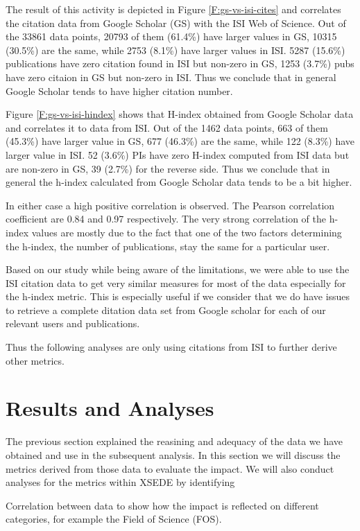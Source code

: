 \documentclass{sig-alternate}
\begin{document}
The result of this activity is depicted in Figure \ref{F:gs-vs-isi-cites} and correlates the citation data from Google Scholar (GS) with the ISI Web of Science. Out of the 33861 data points, 20793 of them (61.4\%) have larger values in GS, 10315 (30.5\%) are the same, while 2753 (8.1\%) have larger values in ISI. 5287 (15.6\%) publications have zero citation found in ISI but non-zero in GS, 1253 (3.7\%) pubs have zero citaion in GS but non-zero in ISI. Thus we conclude that in general Google Scholar tends to have higher citation number. 
 
Figure \ref{F:gs-vs-isi-hindex} shows that H-index obtained from Google Scholar data and correlates it to data from ISI. Out of the 1462 data points, 663 of them (45.3\%) have larger value in GS, 677 (46.3\%) are the same, while 122 (8.3\%) have larger value in ISI. 52 (3.6\%) PIs have zero H-index computed from ISI data but are non-zero in GS, 39 (2.7\%) for the reverse side. Thus we conclude that in general the h-index calculated from Google Scholar data tends to be a bit higher. 
 
In either case a high positive correlation is observed. The Pearson correlation coefficient are 0.84 and 0.97 respectively. The very strong correlation of the h-index values are mostly due to the fact that one of the two factors determining the h-index, the number of publications, stay the same for a particular user. 
 
Based on our study while being aware of the limitations, we were able to use the ISI citation data to get very similar measures for most of the data especially for the h-index metric. This is especially useful if we consider that we do have issues to retrieve a complete ditation data set from Google scholar for each of our relevant users and publications.

Thus the following analyses are only using citations from ISI to further derive other metrics. 
 
\section{Results and Analyses} \label{S:result}
 
The previous section explained the reasining and adequacy of the data we have obtained and use in the subsequent analysis. In this section we will discuss the metrics derived from those data to evaluate the impact. We will also conduct analyses for the metrics within XSEDE by identifying 

Correlation between data to show how the impact is reflected on different categories, for example the Field of Science (FOS). 
 
\end{document}
